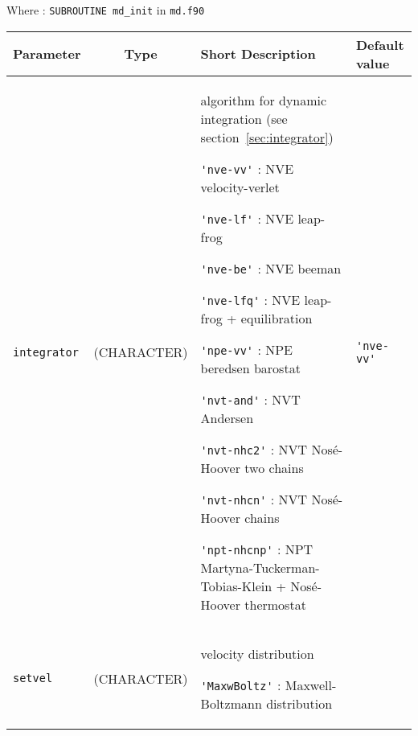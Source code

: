 \documentclass[a4paper]{article}
\begin{document}
Where : \verb?SUBROUTINE md_init? in \verb?md.f90?
\newline

\begin{longtable}{l|c|m{8cm}|m{2cm}}
\hline
\hline
Parameter        &  Type              &          Short Description                                                          & Default value \\
\hline
\hline
\rule[-0.75cm]{0cm}{1.5cm}
\verb?integrator?& (CHARACTER)        &  \newline algorithm for dynamic integration (see section~\ref{sec:integrator}) \newline                   

                                         \verb?'nve-vv'?    : NVE velocity-verlet \newline
					  
					 \verb?'nve-lf'?    : NVE leap-frog \newline
					   
				         \verb?'nve-be'?    : NVE beeman \newline

					 \verb?'nve-lfq'?   : NVE leap-frog +  equilibration \newline                        

					 \verb?'npe-vv'?    : NPE beredsen barostat \newline                        
					 
					 \verb?'nvt-and'?   : NVT Andersen \newline
					 
					 \verb?'nvt-nhc2'?  : NVT Nosé-Hoover two chains \newline

					 \verb?'nvt-nhcn'?  : NVT Nosé-Hoover chains \newline

					 \verb?'npt-nhcnp'? : NPT Martyna-Tuckerman-Tobias-Klein + Nosé-Hoover thermostat \newline 
                                                                                                                            & \verb?'nve-vv'? \tabularnewline
					 
\hline
\rule[-0.75cm]{0cm}{1.5cm}
\verb?setvel?    & (CHARACTER)        &  \newline velocity distribution \newline 
                                        
					 \verb?'MaxwBoltz'? : Maxwell-Boltzmann distribution \newline 


\end{longtable}
\end{document}
